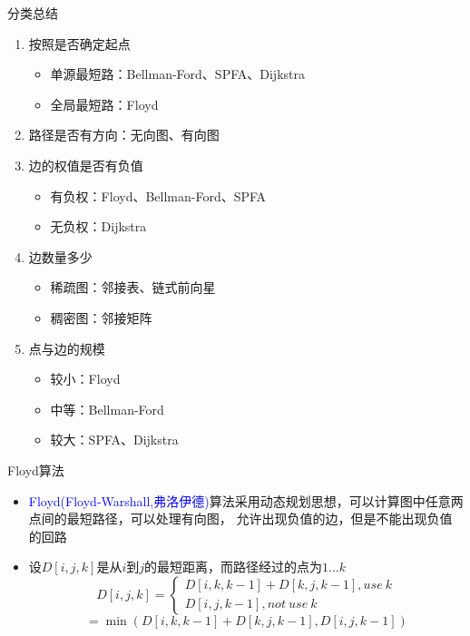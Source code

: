 \begin{frame}{分类总结}
    \begin{enumerate}
        \item 按照是否确定起点
        \begin{itemize}
            \item 单源最短路：Bellman-Ford、SPFA、Dijkstra
            \item 全局最短路：Floyd
        \end{itemize}
        \item 路径是否有方向：无向图、有向图
        \item 边的权值是否有负值
        \begin{itemize}
            \item 有负权：Floyd、Bellman-Ford、SPFA
            \item 无负权：Dijkstra
        \end{itemize}
        \item 边数量多少
        \begin{itemize}
            \item 稀疏图：邻接表、链式前向星
            \item 稠密图：邻接矩阵
        \end{itemize}
        \item 点与边的规模
        \begin{itemize}
            \item 较小：Floyd
            \item 中等：Bellman-Ford
            \item 较大：SPFA、Dijkstra
        \end{itemize}
    \end{enumerate}
\end{frame}
\begin{frame}{Floyd算法}
    \begin{itemize}
        \item \textcolor{blue}{Floyd(Floyd-Warshall,弗洛伊德)}算法采用动态规划思想，可以计算图中任意两点间的最短路径，可以处理有向图， 允许出现负值的边，但是不能出现负值的回路
        \item 设$D[i,j,k]$是从$i$到$j$的最短距离，而路径经过的点为$1\ldots k$
        $$D[i,j,k]=\begin{cases}D[i,k,k-1]+D[k,j,k-1],use \ k \\ D[i,j,k-1],not \  use \ k \end{cases}$$ 
        $$=\min(D[i,k,k-1]+D[k,j,k-1],D[i,j,k-1])$$

    \end{itemize}
\end{frame}
